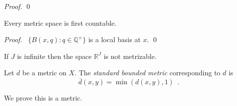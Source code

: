 \begin{proof}
  \pf
  \qed
\end{proof}

\begin{thm}
  Every metric space is first countable.
\end{thm}

\begin{proof}
  \pf\ $\{ B(x, q) : q \in \mathbb{Q}^+ \}$ is a local basis at $x$. \qed
\end{proof}

\begin{cor}
  If $J$ is infinite then the space $\mathbb{R}^J$ is not metrizable.
\end{cor}

\begin{df}
  Let $d$ be a metric on $X$. The \emph{standard bounded metric}
  corresponding to $d$ is
  \[ \overline{d}(x, y) = \min(d(x, y), 1) \enspace . \]

  We prove this is a metric.
\end{df}


